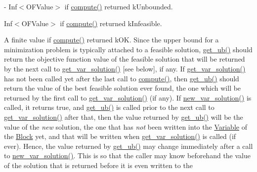 \begin{DoxyItemize}
\item -\/ Inf$<$\+O\+F\+Value$>$ if \mbox{\hyperlink{class_s_m_spp__di__unipi__it_1_1_m_c_f_solver_afc8ff54ab05d22f4cca0fb0bfbeb7a49}{compute()}} returned k\+Unbounded.
\item Inf$<$\+O\+F\+Value$>$ if \mbox{\hyperlink{class_s_m_spp__di__unipi__it_1_1_m_c_f_solver_afc8ff54ab05d22f4cca0fb0bfbeb7a49}{compute()}} returned k\+Infeasible.
\item A finite value if \mbox{\hyperlink{class_s_m_spp__di__unipi__it_1_1_m_c_f_solver_afc8ff54ab05d22f4cca0fb0bfbeb7a49}{compute()}} returned k\+OK. Since the upper bound for a minimization problem is typically attached to a feasible solution, \mbox{\hyperlink{class_s_m_spp__di__unipi__it_1_1_m_c_f_solver_a106686dbd21fcdd86e42130d39a7ec2f}{get\+\_\+ub()}} should return the objective function value of the feasible solution that will be returned by the next call to \mbox{\hyperlink{class_s_m_spp__di__unipi__it_1_1_m_c_f_solver_ac83fa9679882440d13fb5940494699c5}{get\+\_\+var\+\_\+solution()}} \mbox{[}see below\mbox{]}, if any. If \mbox{\hyperlink{class_s_m_spp__di__unipi__it_1_1_m_c_f_solver_ac83fa9679882440d13fb5940494699c5}{get\+\_\+var\+\_\+solution()}} has not been called yet after the last call to \mbox{\hyperlink{class_s_m_spp__di__unipi__it_1_1_m_c_f_solver_afc8ff54ab05d22f4cca0fb0bfbeb7a49}{compute()}}, then \mbox{\hyperlink{class_s_m_spp__di__unipi__it_1_1_m_c_f_solver_a106686dbd21fcdd86e42130d39a7ec2f}{get\+\_\+ub()}} should return the value of the best feasible solution ever found, the one which will be returned by the first call to \mbox{\hyperlink{class_s_m_spp__di__unipi__it_1_1_m_c_f_solver_ac83fa9679882440d13fb5940494699c5}{get\+\_\+var\+\_\+solution()}} (if any). If \mbox{\hyperlink{class_s_m_spp__di__unipi__it_1_1_m_c_f_solver_a62678dc9f7485d5a2992c588c5dc7d49}{new\+\_\+var\+\_\+solution()}} is called, it returns true, and \mbox{\hyperlink{class_s_m_spp__di__unipi__it_1_1_m_c_f_solver_a106686dbd21fcdd86e42130d39a7ec2f}{get\+\_\+ub()}} is called prior to the next call to \mbox{\hyperlink{class_s_m_spp__di__unipi__it_1_1_m_c_f_solver_ac83fa9679882440d13fb5940494699c5}{get\+\_\+var\+\_\+solution()}} after that, then the value returned by \mbox{\hyperlink{class_s_m_spp__di__unipi__it_1_1_m_c_f_solver_a106686dbd21fcdd86e42130d39a7ec2f}{get\+\_\+ub()}} will be the value of the {\itshape new} solution, the one that has {\itshape not} been written into the \mbox{\hyperlink{class_s_m_spp__di__unipi__it_1_1_variable}{Variable}} of the \mbox{\hyperlink{class_s_m_spp__di__unipi__it_1_1_block}{Block}} yet, and that will be written when \mbox{\hyperlink{class_s_m_spp__di__unipi__it_1_1_m_c_f_solver_ac83fa9679882440d13fb5940494699c5}{get\+\_\+var\+\_\+solution()}} is called (if ever). Hence, the value returned by \mbox{\hyperlink{class_s_m_spp__di__unipi__it_1_1_m_c_f_solver_a106686dbd21fcdd86e42130d39a7ec2f}{get\+\_\+ub()}} may change immediately after a call to \mbox{\hyperlink{class_s_m_spp__di__unipi__it_1_1_m_c_f_solver_a62678dc9f7485d5a2992c588c5dc7d49}{new\+\_\+var\+\_\+solution()}}. This is so that the caller may know beforehand the value of the solution that is returned before it is even written to the 
\end{DoxyItemize}
